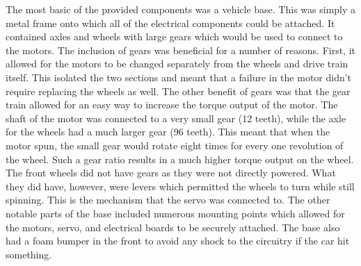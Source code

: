 \documentclass[conference]{IEEEtran}
\begin{document}
    \begin{table}[h]
        \caption{Components of the Car}
        \label{tab:bom}
        \centering
        \end{table}

    The most basic of the provided components was a vehicle base. This was
    simply a metal frame onto which all of the electrical components could be
    attached. It contained axles and wheels with large gears which would be
    used to connect to the motors. The inclusion of gears was beneficial for
    a number of reasons. First, it allowed for the motors to be changed
    separately from the wheels and drive train itself. This isolated the two
    sections and meant that a failure in the motor didn't require replacing
    the wheels as well. The other benefit of gears was that the gear train
    allowed for an easy way to increase the torque output of the motor. The
    shaft of the motor was connected to a very small gear (12 teeth), while
    the axle for the wheels had a much larger gear (96 teeth). This meant that
    when the motor spun, the small gear would rotate eight times for every one
    revolution of the wheel. Such a gear ratio results in a much higher torque
    output on the wheel. The front wheels did not have gears as they were not
    directly powered. What they did have, however, were levers which permitted
    the wheels to turn while still spinning. This is the mechanism that the
    servo was connected to. The other notable parts of the base included
    numerous mounting points which allowed for the motors, servo, and
    electrical boards to be securely attached. The base also had a foam bumper
    in the front to avoid any shock to the circuitry if the car hit something.
    
\end{document}
